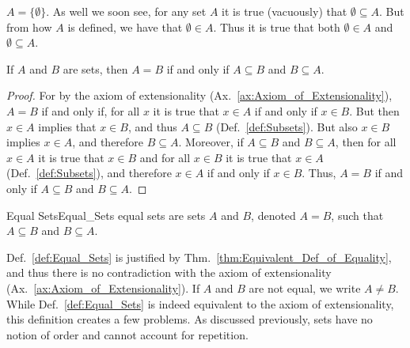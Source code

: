         $A=\{\emptyset\}$. As well we soon see, for any set $A$ it is true
        (vacuously) that $\emptyset\subseteq{A}$. But from how $A$ is defined,
        we have that $\emptyset\in{A}$. Thus it is true that both
        $\emptyset\in{A}$ and $\emptyset\subseteq{A}$.
        \begin{theorem}
            \label{thm:Equivalent_Def_of_Equality}%
            If $A$ and $B$ are sets, then $A=B$ if and only if $A\subseteq{B}$
            and $B\subseteq{A}$.
        \end{theorem}
        \begin{proof}
            For by the axiom of extensionality
            (Ax.~\ref{ax:Axiom_of_Extensionality}), $A=B$ if and only if, for
            all $x$ it is true that $x\in{A}$ if and only if $x\in{B}$. But then
            $x\in{A}$ implies that $x\in{B}$, and thus $A\subseteq{B}$
            (Def.~\ref{def:Subsets}). But also $x\in{B}$ implies $x\in{A}$, and
            therefore $B\subseteq{A}$. Moreover, if $A\subseteq{B}$ and
            $B\subseteq{A}$, then for all $x\in{A}$ it is true that $x\in{B}$
            and for all $x\in{B}$ it is true that $x\in{A}$
            (Def.~\ref{def:Subsets}), and therefore $x\in{A}$ if and only if
            $x\in{B}$. Thus, $A=B$ if and only if $A\subseteq{B}$ and
            $B\subseteq{A}$.
        \end{proof}
        \begin{fdefinition}{Equal Sets}{Equal_Sets}
            \Glspl{equal set} are \glspl{set} $A$ and $B$, denoted $A=B$, such
            that $A\subseteq{B}$ and $B\subseteq{A}$.
        \end{fdefinition}
        Def.~\ref{def:Equal_Sets} is justified by
        Thm.~\ref{thm:Equivalent_Def_of_Equality}, and thus there is no
        contradiction with the axiom of extensionality
        (Ax.~\ref{ax:Axiom_of_Extensionality}). If $A$ and $B$ are not equal, we
        write $A\ne{B}$. While Def.~\ref{def:Equal_Sets} is indeed equivalent to
        the axiom of extensionality, this definition creates a few problems. As
        discussed previously, sets have no notion of order and cannot account
        for repetition.
